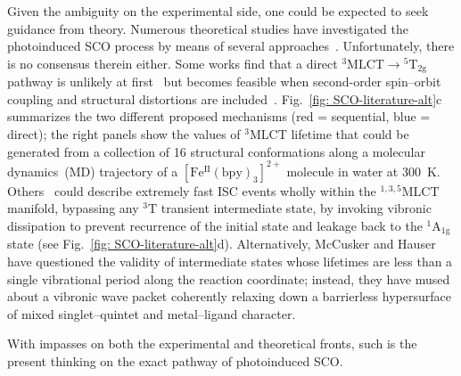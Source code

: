 Given the ambiguity on the experimental side,
one could be expected to seek guidance from theory.
Numerous theoretical studies have investigated the photoinduced SCO process
by means of several approaches~\cite{Koshino1999, Ordejon2008, deGraaf2010, Sousa2013,
Domingo2014, Sousa2017, Sousa2018a, Sousa2018b, Vanko2015, Suaud2009, Iuchi2014, Iuchi2016,
Veeneedaal2010, Chang2010, Veenendaal2017, Nance2015, Kuiken2011, Capano2013,
Papai2013, Fredin2014, Penfold2018}.
Unfortunately, there is no consensus therein either.
%
Some works find that a direct $\mathrm{^3 MLCT} \rightarrow \mathrm{^5 T_{2g}}$ pathway is
unlikely at first~\cite{Ordejon2008, deGraaf2010, Sousa2013, Domingo2014, Sousa2017}
but becomes feasible when second-order spin--orbit coupling and structural distortions
are included~\cite{Sousa2018a, Sousa2018b}.
Fig.~\ref{fig: SCO-literature-alt}c summarizes the two different proposed
mechanisms (red = sequential, blue = direct);
the right panels show the values of $\mathrm{^3 MLCT}$ lifetime
that could be generated from a collection of 16 structural conformations
along a molecular dynamics~(MD) trajectory of a $\mathrm{[Fe^{II}(bpy)_3]^{2+}}$ molecule
in water at 300~K.
%
Others~\cite{Veeneedaal2010, Chang2010, Veenendaal2017} could describe
extremely fast ISC events wholly within the $\mathrm{^{1,3,5} MLCT}$ manifold,
bypassing any $\mathrm{^3 T}$ transient intermediate state,
by invoking vibronic dissipation to prevent recurrence of the initial state
and leakage back to the $\mathrm{^1 A_{1g}}$ state (see Fig.~\ref{fig: SCO-literature-alt}d).
%
Alternatively, McCusker and Hauser~\cite{McCusker2014, Hauser2017} have
questioned the validity of intermediate states whose lifetimes are less than
a single vibrational period along the reaction coordinate;
instead, they have mused about a vibronic wave packet coherently relaxing
down a barrierless hypersurface of mixed singlet--quintet and metal--ligand character.

With impasses on both the experimental and theoretical fronts,
such is the present thinking on the exact pathway of photoinduced SCO.





